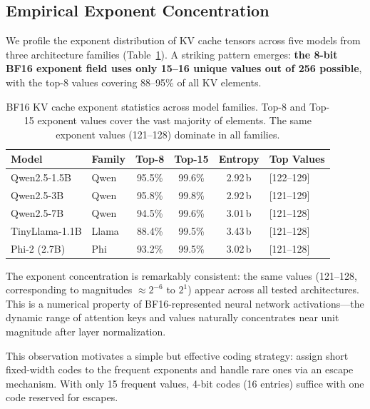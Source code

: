 \subsection{Empirical Exponent Concentration}
\label{sec:exponent}

We profile the exponent distribution of KV cache tensors across five models from three architecture families (Table~\ref{tab:exponent}). A striking pattern emerges: \textbf{the 8-bit BF16 exponent field uses only 15--16 unique values out of 256 possible}, with the top-8 values covering 88--95\% of all KV elements.

\begin{table}[t]
\centering
\small
\caption{BF16 KV cache exponent statistics across model families. Top-8 and Top-15 exponent values cover the vast majority of elements. The same exponent values (121--128) dominate in all families.}
\label{tab:exponent}
\begin{tabular}{llcccl}
\toprule
Model & Family & Top-8 & Top-15 & Entropy & Top Values \\
\midrule
Qwen2.5-1.5B & Qwen & 95.5\% & 99.6\% & 2.92\,b & [122--129] \\
Qwen2.5-3B & Qwen & 95.8\% & 99.8\% & 2.92\,b & [121--129] \\
Qwen2.5-7B & Qwen & 94.5\% & 99.6\% & 3.01\,b & [121--128] \\
TinyLlama-1.1B & Llama & 88.4\% & 99.5\% & 3.43\,b & [121--128] \\
Phi-2 (2.7B) & Phi & 93.2\% & 99.5\% & 3.02\,b & [121--128] \\
\bottomrule
\end{tabular}
\end{table}

The exponent concentration is remarkably consistent: the same values (121--128, corresponding to magnitudes $\approx 2^{-6}$ to $2^{1}$) appear across all tested architectures. This is a numerical property of BF16-represented neural network activations---the dynamic range of attention keys and values naturally concentrates near unit magnitude after layer normalization.

This observation motivates a simple but effective coding strategy: assign short fixed-width codes to the frequent exponents and handle rare ones via an escape mechanism. With only 15 frequent values, 4-bit codes (16 entries) suffice with one code reserved for escapes.
